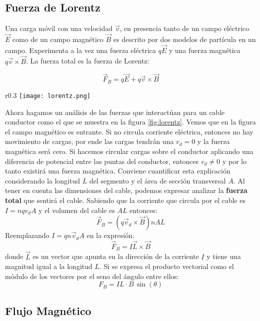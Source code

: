 \subsection{Fuerza de Lorentz}

Una carga móvil con una velocidad \(\vec{v}\), en presencia tanto de un campo eléctrico \(\vec{E}\) como de un campo magnético \(\vec{B}\) es descrito por dos modelos de partícula en un campo. Experimenta a la vez una fuerza eléctrica \(q\vec{E}\) y una fuerza magnética \(q\vec{v} \times \vec{B}\). La fuerza total es la fuerza de Lorentz:

\[
  \vec{F}_B = q\vec{E} + q\vec{v} \times \vec{B}
\]

\begin{wrapfigure}{r}{0.3\textwidth}
  \centering
  \texttt{[image: lorentz.png]}
  \caption{Un segmento de un alambre conduciendo corriente en un campo magnético \(\vec{B}\)}
  \label{fig:lorentz}
\end{wrapfigure}
Ahora hagamos un análisis de las fuerzas que interactúan para un cable conductor como el que se muestra en la figura \ref{fig:lorentz}. Vemos que en la figura el campo magnético es entrante. Si no circula corriente eléctrica, entonces no hay movimiento de cargas, por ende las cargas tendrán una \(v_d=0\) y la fuerza magnética será cero. Si hacemos circular cargas sobre el conductor aplicando una diferencia de potencial entre las puntas del conductor, entonces \(v_d \neq 0\) y por lo tanto existirá una fuerza magnética. 
Conviene cuantificar esta explicación considerando la longitud \(L\) del segmento y el área de sección transversal \(A\). Al tener en cuenta las dimensiones del cable, podemos expresar analizar la \textbf{fuerza total} que sentirá el cable. Sabiendo que la corriente que circula por el cable es \(I = nq v_d A\) y el volumen del cable es \(AL\) entonces: 
\[
  \vec{F}_B = (q\vec{v}_d \times \vec{B})nAL
\]
Reemplazando \(I=qn \vec{v}_d A\) en la expresión:
\[
  \vec{F}_B = I\vec{L} \times \vec{B}
\]
donde \(\vec{L}\) es un vector que apunta en la dirección de la corriente \(I\) y tiene una magnitud igual a la longitud \(L\). Si se expresa el producto vectorial como el módulo de los vectores por el seno del ángulo entre ellos:
\begin{equation}
  \boxed{F_B = IL \cdot B \, \sin(\theta)}
\end{equation}

\subsection{Flujo Magnético}

